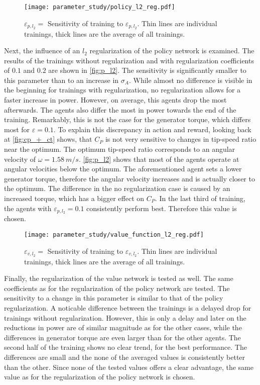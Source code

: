 \begin{figure}[ht]
	\centering
	\texttt{[image: parameter\_study/policy\_l2\_reg.pdf]}
	\caption{$\varepsilon_{p,l_2}=$ Sensitivity of training to $\varepsilon_{p,l_2}$. Thin lines are individual trainings, thick lines are the average of all trainings.}
	\label{fig:p_l2}
\end{figure}
Next, the influence of an $l_2$ regularization of the policy network is examined. The results of the trainings without regularization and with regularization coefficients of $0.1$ and $0.2$ are shown in \autoref{fig:p_l2}. The sensitivity is significantly smaller to this parameter than to an increase in $\sigma_A$. While almost no difference is visible in the beginning for trainings with regularization, no regularization allows for a faster increase in power. However, on average, this agents drop the most afterwards. The agents also differ the most in power towards the end of the training. Remarkably, this is not the case for the generator torque, which differs most for $\varepsilon = 0.1$. To explain this discrepancy in action and reward, looking back at \autoref{fig:cp_+_ct} shows, that $C_P$ is not very sensitive to changes in tip-speed ratio near the optimum. The optimum tip-speed ratio corresponds to an angular velocity of $\omega=\SI{1.58}{m/s}$. \autoref{fig:p_l2} shows that most of the agents operate at angular velocities below the optimum. The aforementioned agent sets a lower generator torque, therefore the angular velocity increases and is actually closer to the optimum. The difference in the no regularization case is caused by an increased torque, which has a bigger effect on $C_P$. In the last third of training, the agents with $\varepsilon_{p,l_2}=0.1$ consistently perform best. Therefore this value is chosen. \\
\begin{figure}[h]%
	\centering
	\texttt{[image: parameter\_study/value\_function\_l2\_reg.pdf]}
	\caption{$\varepsilon_{v,l_2}=$ Sensitivity of training to $\varepsilon_{v,l_2}$. Thin lines are individual trainings, thick lines are the average of all trainings.}
	\label{fig:v_l2}
\end{figure}
Finally, the regularization of the value network is tested as well. The same coefficients as for the regularization of the policy network are tested. The sensitivity to a change in this parameter is similar to that of the policy regularization. A noticable difference between the trainings is a delayed drop for trainings without regularization. However, this is only a delay and later on the reductions in power are of similar magnitude as for the other cases, while the differences in generator torque are even larger than for the other agents. The second half of the training shows no clear trend, for the best performance. The differences are small and the none of the averaged values is consistently better than the other. Since none of the tested values offers a clear advantage, the same value as for the regularization of the policy network is chosen.\\
